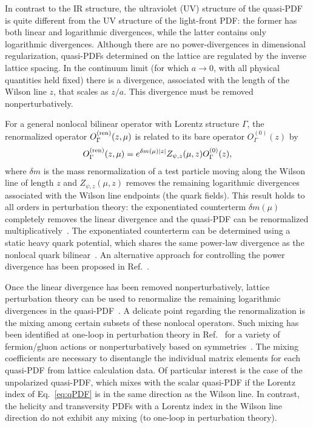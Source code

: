 \begin{itemize}
In contrast to the IR structure, the ultraviolet (UV) structure of the quasi-PDF is quite different from the UV structure of the light-front PDF: the former has both linear and logarithmic divergences, while the latter contains only logarithmic divergences. Although there are no power-divergences in dimensional regularization, quasi-PDFs determined on the lattice are regulated by the inverse lattice spacing. In the continuum limit (for which $a\to 0$, with all physical quantities held fixed) there is a divergence, associated with the length of the Wilson line $z$, that scales as $z/a$. This divergence must be removed nonperturbatively.

For a general nonlocal bilinear operator with Lorentz structure $\Gamma$, the renormalized operator $O_{\Gamma}^{\rm (ren)}(z,\mu)$ is
related to its bare operator $O^{(0)}_{\Gamma}(z)$ by~\cite{Dotsenko:1979wb, Arefeva:1980zd, Craigie:1980qs,Dorn:1986dt}
\begin{eqnarray}\label{eq:renorm_non-local}
O_{\Gamma}^{\rm (ren)}(z,\mu)=e^{\delta m(\mu)|z|}Z_{\psi, z}(\mu,z)O^{(0)}_{\Gamma}(z),
\end{eqnarray}
where $\delta m$ is the mass renormalization of a test particle moving along the Wilson line of length $z$ and $Z_{\psi, z}(\mu,z)$ removes the remaining logarithmic divergences associated with the Wilson line endpoints (the quark fields). This result holds to all orders in perturbation theory: the exponentiated counterterm $\delta m(\mu)$ completely removes the linear divergence and the quasi-PDF can be renormalized multiplicatively~\cite{Ji:2015jwa,Ji:2017oey}. The exponentiated counterterm can be determined using a static heavy quark potential, which shares the same power-law divergence as the nonlocal quark bilinear~\cite{Musch:2010ka,Ishikawa:2016znu, Chen:2016fxx}. An alternative approach for controlling the power divergence has been proposed in Ref.~\cite{Monahan:2016bvm}.

Once the linear divergence has been removed nonperturbatively, lattice perturbation theory can be used to renormalize the remaining logarithmic divergences in the quasi-PDF~\cite{Ishikawa:2016znu,Chen:2016fxx,Carlson:2017gpk,Xiong:2017jtn}. A delicate point regarding the renormalization is the mixing among certain subsets of these nonlocal operators. Such mixing has been identified at one-loop in perturbation theory in Ref.~\cite{Constantiou:2017soon} for a variety of fermion/gluon actions or nonperturbatively based on symmetries~\cite{Chen:2017mzz}. The mixing coefficients are necessary to disentangle the individual matrix elements for each quasi-PDF from lattice calculation data. Of particular interest is the case of the unpolarized quasi-PDF, which mixes with the scalar quasi-PDF if the Lorentz index of Eq.~\eqref{eq:qPDF} is in the same direction as the Wilson line. In contrast, the helicity and transversity PDFs with a Lorentz index in the Wilson line direction do not exhibit any mixing (to one-loop in perturbation theory). 


\end{itemize}
